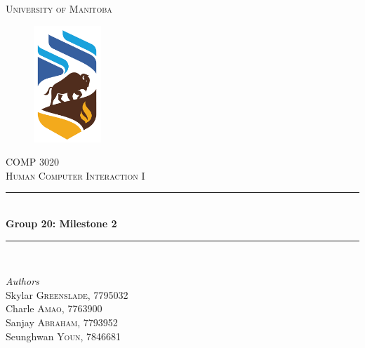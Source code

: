 \documentclass{article}
\begin{document}
\begin{titlepage} %
	\newcommand{\HRule}{\rule{\linewidth}{0.5mm}} %
	
	\center %
	
	
	\textsc{\LARGE University of Manitoba}\\[1.5cm] %
	
	\begin{figure}
	    \centering
	    \includegraphics[width=1in]{uofmlogo.png}
	    \label{fig:uofm}
	\end{figure}
	
	\textsc{\Large COMP 3020}\\[0.5cm] %
	
	\textsc{\large Human Computer Interaction I}\\[0.5cm] %
	
	
	\HRule\\[0.4cm]
	
	{\huge\bfseries Group 20: Milestone 2}\\[0.4cm] %
	
	\HRule\\[1.5cm]
	
	
	\begin{minipage}{0.4\textwidth}
		\begin{flushleft}
			\large
			\textit{Authors}\\
			Skylar \textsc{Greenslade}, 7795032\\
			Charle \textsc{Amao}, 7763900\\%
			Sanjay \textsc{Abraham}, 7793952\\
			Seunghwan \textsc{Youn}, 7846681
			

\end{flushleft}
\end{minipage}
\end{titlepage}
\end{document}
